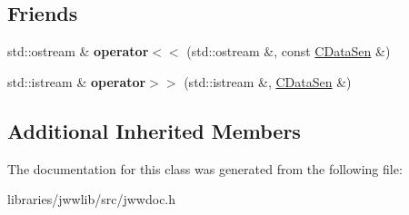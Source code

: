 \subsection*{Friends}
\begin{DoxyCompactItemize}
\item 
\hypertarget{classCDataSen_a28e36ace884ea5948f79ab084be9ed74}{std\-::ostream \& {\bfseries operator$<$$<$} (std\-::ostream \&, const \hyperlink{classCDataSen}{C\-Data\-Sen} \&)}\label{classCDataSen_a28e36ace884ea5948f79ab084be9ed74}

\item 
\hypertarget{classCDataSen_a54799f960bed09b818a0b3770a09bcc0}{std\-::istream \& {\bfseries operator$>$$>$} (std\-::istream \&, \hyperlink{classCDataSen}{C\-Data\-Sen} \&)}\label{classCDataSen_a54799f960bed09b818a0b3770a09bcc0}

\end{DoxyCompactItemize}
\subsection*{Additional Inherited Members}


The documentation for this class was generated from the following file\-:\begin{DoxyCompactItemize}
\item 
libraries/jwwlib/src/jwwdoc.\-h\end{DoxyCompactItemize}
